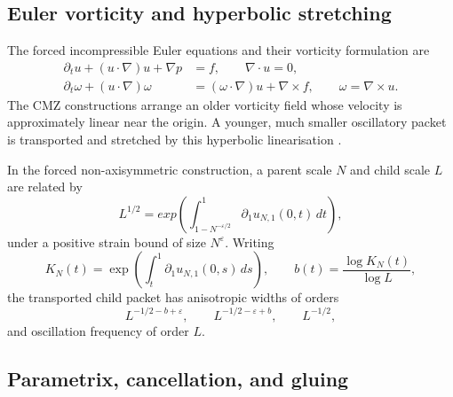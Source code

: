 \documentclass[11pt]{amsart}
\numberwithin{equation}{section}
\theoremstyle{plain}
\theoremstyle{definition}
\theoremstyle{remark}
\newcommand{\eps}{\varepsilon}
\begin{document}
\subsection{Euler vorticity and hyperbolic stretching}
\label{subsec:Euler-stretching}

The forced incompressible Euler equations and their vorticity formulation are
\begin{align}
\partial_tu+(u\cdot\nabla)u+\nabla p&=f,
\qquad \nabla\cdot u=0,
\label{eq:forced-Euler}\\
\partial_t\omega+(u\cdot\nabla)\omega
&=(\omega\cdot\nabla)u+\nabla\times f,
\qquad \omega=\nabla\times u.
\label{eq:forced-vorticity}
\end{align}
The CMZ constructions arrange an older vorticity field whose velocity is
approximately linear near the origin.  A younger, much smaller oscillatory
packet is transported and stretched by this hyperbolic linearisation
\cite{CordobaMartinezZoroa2023,CordobaMartinezZoroaZheng2023}.

In the forced non-axisymmetric construction, a parent scale $N$ and child
scale $L$ are related by
\begin{equation}
L^{1/2}=exp\left(
\int_{1-N^{-\eps/2}}^1
\partial_1u_{N,1}(0,t)\,dt\right),
\label{eq:CMZ-scale-relation}
\end{equation}
under a positive strain bound of size $N^\eps$.  Writing
\begin{equation}
K_N(t)=\exp\left(\int_t^1\partial_1u_{N,1}(0,s)\,ds\right),
\qquad
b(t)=\frac{\log K_N(t)}{\log L},
\label{eq:CMZ-K-b}
\end{equation}
the transported child packet has anisotropic widths of orders
\begin{equation}
L^{-1/2-b+\eps},\qquad
L^{-1/2-\eps+b},\qquad
L^{-1/2},
\label{eq:CMZ-support-widths}
\end{equation}
and oscillation frequency of order $L$.

\subsection{Parametrix, cancellation, and gluing}
\label{subsec:CMZ-proof-stages}
\end{document}
